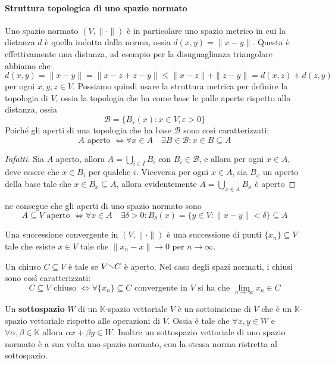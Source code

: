 \paragraph{Struttura topologica di uno spazio normato}
Uno spazio normato \({(V, \|\cdot \|)}\) è in particolare uno spazio metrico in
cui la distanza \(d\) è quella indotta dalla norma, ossia \(d(x, y) = \|x -
y\|\). Questa è effettivamente una distanza, ad esempio per la disuguaglianza
triangolare abbiamo che \(d{(x, y)} = \|x - y\| = \| x - z + z - y\| \le \| x-
z\| + \|z - y\| = d{(x, z)} + d{(z, y)}\) per ogni \(x, y, z \in V\). Possiamo
quindi usare la struttura metrica per definire la topologia di \(V\), ossia la
topologia che ha come base le palle aperte rispetto alla distanza, ossia
\[
    \mathcal{B} = \{B_{\varepsilon}(x) : x \in V, \varepsilon > 0\}
\]
Poiché gli aperti di una topologia che ha base \(\mathcal{B}\) sono così caratterizzati:
\[
    A \text{ aperto } \iff \forall x \in A \quad \exists B \in \mathcal{B} : x
    \in B \subseteq A
\]
\begin{proof}[Infatti]
    Sia \(A\) aperto, allora \(A = \bigcup_{i \in I} B_{i}\) con
    \(B_{i} \in \mathcal{B}\), e allora per ogni \(x \in A\), deve essere che
    \(x \in B_{i}\) per qualche \(i\). Viceversa 
    per ogni \(x \in A\), sia \(B_x \) un aperto della base tale che \(x
    \in B_x \subseteq A \), allora evidentemente \(A = \bigcup_{x \in A} B_x\) è
    aperto
\end{proof}
ne consegue che gli aperti di uno spazio normato sono 
\[
    A \subseteq V \text{ aperto } \iff \forall x \in A \quad \exists \delta > 0
    : B_\delta {(x)} = \{y \in V: \|x- y\| < \delta\} \subseteq A 
\]

Una successione convergente in \({(V, \|\cdot \|)}\) è una successione di punti \(\{x_{n}\}
\subseteq V  \) tale che esiste \(x \in V\) tale che \(\|x_{n} -x\| \to 0\) per
\(n \to \infty\).

Un chiuso \(C \subseteq V \) è tale se \(V \sminus C\) è aperto. Nel caso degli
spazi normati, i chiusi sono così caratterizzati:
\[
    C \subseteq V \text{ chiuso } \iff \forall \{x_{n}\} \subseteq C \text{ convergente in } V
    \text{ si ha che } \lim_{n \to \infty} x_{n} \in C    
\]

Un \textbf{sottospazio} \(W\) di un \(\mathbb{K}\)-spazio vettoriale \(V\) è un sottoinsieme
di \(V\) che è un \(\mathbb{K}\)-spazio vettoriale rispetto alle operazioni di \(V\). Ossia è
tale che \(\forall x, y \in W\) e \(\forall \alpha, \beta \in \mathbb{K}\)
allora \(\alpha x + \beta y \in W\). Inoltre un sottospazio vettoriale di uno
spazio normato è a sua volta uno spazio normato, con la stessa norma ristretta
al sottospazio.

